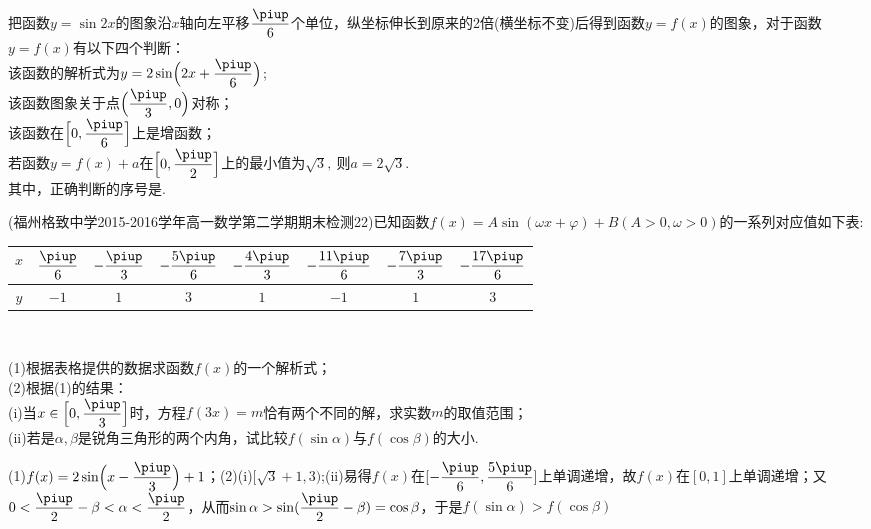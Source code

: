 \begin{exercise}
    \item%
      把函数$ y=\sin 2x $的图象沿$x$轴向左平移$ \dfrac{\piup}{6} $个单位，纵坐标伸长到原来的2倍(横坐标不变)后得到函数$ y=f(x) $的图象，对于函数$ y=f(x) $有以下四个判断：\\
       该函数的解析式为$ y=2\sin \Bigl(2x+\dfrac{\piup}{6}\Bigr) $;\\
       该函数图象关于点$ \Bigl(\dfrac{\piup}{3},0\Bigr) $对称；\\
       该函数在$ \Bigl[0,\dfrac{\piup}{6}\Bigr] $上是增函数；\\
       若函数$ y=f(x)+a $在$ \Bigl[0,\dfrac{\piup}{2}\Bigr] $上的最小值为$ \sqrt{3},\  $则$ a=2\sqrt{3} .$\\
      其中，正确判断的序号是\tk.
      \begin{answer}
      \end{answer}
    \item%
      (福州格致中学2015-2016学年高一数学第二学期期末检测22)已知函数$f(x)=A\sin(\omega x+\varphi)+B (A>0,\omega>0)$的一系列对应值如下表:
      \begin{center}
        \renewcommand{\arraystretch}{1.4}
        \begin{tabular}{|*{8}{c|}}
          \hline
            $x$
            &$\dfrac{\piup}6$
            &$-\dfrac{\piup}3$
            &$-\dfrac{5\piup}6$
            &$-\dfrac{4\piup}3$
            &$-\dfrac{11\piup}6$
            &$-\dfrac{7\piup}3$
            &$-\dfrac{17\piup}6$\\
          \hline
            $y$
            &$-1$
            &$1$
            &$3$
            &$1$
            &$-1$
            &$1$
            &$3$\\
          \hline
        \end{tabular}\\
      \end{center}
      (1)根据表格提供的数据求函数$f(x)$的一个解析式；\\
      (2)根据(1)的结果：\\
      \;(i)当$x\in\Bigl[0,\dfrac{\piup}3\Bigr]$时，方程$f(3x)=m$恰有两个不同的解，求实数$m$的取值范围；\\
      \;(ii)若是$\alpha,\beta$是锐角三角形的两个内角，试比较$f(\sin \alpha)$与$f(\cos \beta)$的大小.
      \begin{answer}
        (1)$f(x)=2\sin\Bigl(x-\dfrac{\piup}3\Bigr)+1$；(2)(i)$[\sqrt{3}+1,3)$;(ii)易得$f(x)$在$[-\dfrac{\piup}6,\dfrac{5\piup}6]$上单调递增，故$f(x)$在$[0,1]$上单调递增；又$0<\dfrac{\piup}2-\beta<\alpha<\dfrac{\piup}2$，从而$\sin\alpha>\sin(\dfrac{\piup}2-\beta)=\cos\beta$，于是$f(\sin \alpha)>f(\cos \beta)$

\end{answer}
\end{exercise}
